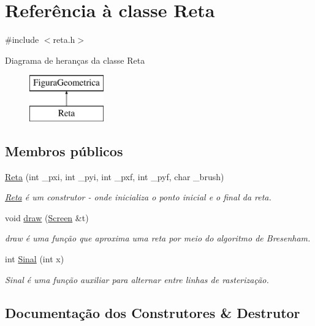 \hypertarget{class_reta}{}\section{Referência à classe Reta}
\label{class_reta}


{\ttfamily \#include $<$reta.\+h$>$}

Diagrama de heranças da classe Reta\begin{figure}[H]
\begin{center}
\leavevmode
\includegraphics[height=2.000000cm]{class_reta}
\end{center}
\end{figure}
\subsection*{Membros públicos}
\begin{DoxyCompactItemize}
\item 
\hyperlink{class_reta_a5b0e120cd00f7bd931c30a62ead00d13}{Reta} (int \+\_\+pxi, int \+\_\+pyi, int \+\_\+pxf, int \+\_\+pyf, char \+\_\+brush)
\begin{DoxyCompactList}\small\item\em \hyperlink{class_reta}{Reta} é um construtor -\/ onde inicializa o ponto inicial e o final da reta. \end{DoxyCompactList}\item 
void \hyperlink{class_reta_ac2e9805183cd474b62bffd8b032cd780}{draw} (\hyperlink{class_screen}{Screen} \&t)
\begin{DoxyCompactList}\small\item\em draw é uma função que aproxima uma reta por meio do algoritmo de Bresenham. \end{DoxyCompactList}\item 
int \hyperlink{class_reta_a0890517655f27827a827c88850f8984e}{Sinal} (int x)
\begin{DoxyCompactList}\small\item\em Sinal é uma função auxiliar para alternar entre linhas de rasterização. \end{DoxyCompactList}\end{DoxyCompactItemize}


\subsection{Documentação dos Construtores \& Destrutor}
\mbox{\label{class_reta_a5b0e120cd00f7bd931c30a62ead00d13}} 
